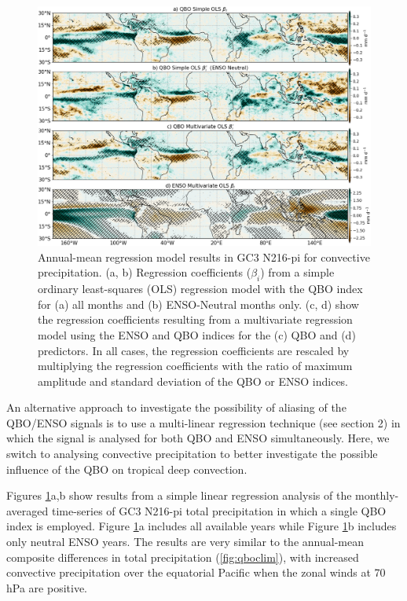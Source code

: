 \begin{figure}[t!]
\centering
 \noindent
 \includegraphics[width=\linewidth]{figures/regress_n216v2.png}
\caption[Convective precipitation regression analysis]{Annual-mean regression model results in GC3 N216-pi for convective precipitation. (a, b) Regression coefficients ($\beta_i$) from a simple ordinary least-squares (OLS) regression model with the QBO index for (a) all months and (b) ENSO-Neutral months only. (c, d) show the regression coefficients resulting from a multivariate regression model using the ENSO and QBO indices for the (c) QBO and (d) predictors. In all cases, the regression coefficients are rescaled by multiplying the regression coefficients with the ratio of maximum amplitude and standard deviation of the QBO or ENSO indices. }
\label{fig:enso_regress}
\end{figure}

An alternative approach to investigate the possibility of aliasing of the QBO/ENSO signals is to use a multi-linear regression technique (see section 2) in which the signal is analysed for both QBO and ENSO simultaneously. Here, we switch to analysing convective precipitation to better investigate the possible influence of the QBO on tropical deep convection.

Figures \ref{fig:enso_regress}a,b show results from a simple linear regression analysis of the monthly-averaged time-series of GC3 N216-pi total precipitation in which a single QBO index is employed. Figure \ref{fig:enso_regress}a includes all available years while Figure \ref{fig:enso_regress}b includes only neutral ENSO years. The results are very similar to the annual-mean composite differences in total precipitation (\ref{fig:qboclim}), with increased convective precipitation over the equatorial Pacific when the zonal winds at 70 hPa are positive. 

